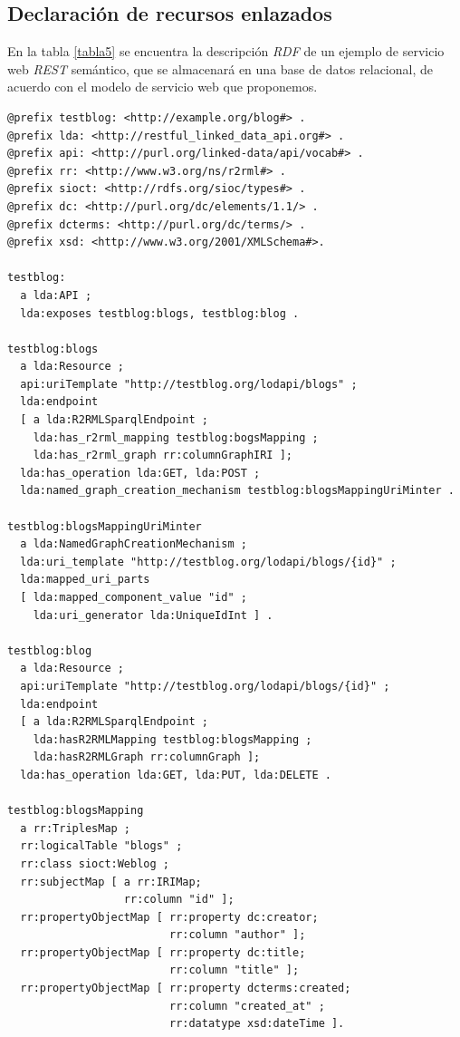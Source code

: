 \subsection{Declaraci\'on de recursos enlazados}

En la tabla \ref{tabla5} se encuentra la descripci\'on \textit{RDF} de un ejemplo de servicio web \textit{REST} sem\'antico, que se almacenar\'a en una base de datos relacional, de acuerdo con el modelo de servicio web que proponemos.\\


\begin{lstlisting}
@prefix testblog: <http://example.org/blog#> .
@prefix lda: <http://restful_linked_data_api.org#> .
@prefix api: <http://purl.org/linked-data/api/vocab#> .
@prefix rr: <http://www.w3.org/ns/r2rml#> .
@prefix sioct: <http://rdfs.org/sioc/types#> .
@prefix dc: <http://purl.org/dc/elements/1.1/> .
@prefix dcterms: <http://purl.org/dc/terms/> .
@prefix xsd: <http://www.w3.org/2001/XMLSchema#>.

testblog:
  a lda:API ;
  lda:exposes testblog:blogs, testblog:blog .

testblog:blogs
  a lda:Resource ;
  api:uriTemplate "http://testblog.org/lodapi/blogs" ;
  lda:endpoint
  [ a lda:R2RMLSparqlEndpoint ;
    lda:has_r2rml_mapping testblog:bogsMapping ;
    lda:has_r2rml_graph rr:columnGraphIRI ];
  lda:has_operation lda:GET, lda:POST ;
  lda:named_graph_creation_mechanism testblog:blogsMappingUriMinter .

testblog:blogsMappingUriMinter
  a lda:NamedGraphCreationMechanism ;
  lda:uri_template "http://testblog.org/lodapi/blogs/{id}" ;
  lda:mapped_uri_parts
  [ lda:mapped_component_value "id" ;
    lda:uri_generator lda:UniqueIdInt ] .

testblog:blog
  a lda:Resource ;
  api:uriTemplate "http://testblog.org/lodapi/blogs/{id}" ;
  lda:endpoint
  [ a lda:R2RMLSparqlEndpoint ;
    lda:hasR2RMLMapping testblog:blogsMapping ;
    lda:hasR2RMLGraph rr:columnGraph ];
  lda:has_operation lda:GET, lda:PUT, lda:DELETE .

testblog:blogsMapping
  a rr:TriplesMap ;
  rr:logicalTable "blogs" ;
  rr:class sioct:Weblog ;
  rr:subjectMap [ a rr:IRIMap;
                  rr:column "id" ];
  rr:propertyObjectMap [ rr:property dc:creator;
                         rr:column "author" ];
  rr:propertyObjectMap [ rr:property dc:title;
                         rr:column "title" ];
  rr:propertyObjectMap [ rr:property dcterms:created;
                         rr:column "created_at" ;
                         rr:datatype xsd:dateTime ].
\end{lstlisting}


